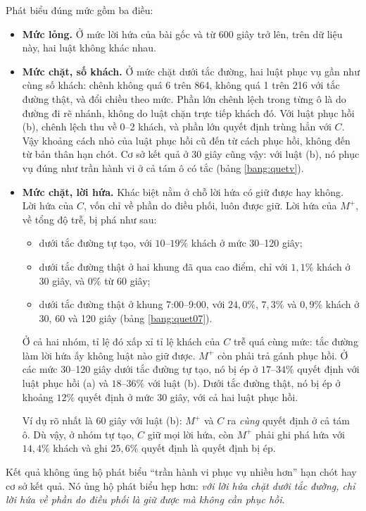 Phát biểu đúng mức gồm ba điều:
\begin{itemize}
\item \textbf{Mức lỏng.} Ở mức lời hứa của bài gốc và từ 600 giây trở lên, trên dữ liệu này, hai luật
không khác nhau.
\item \textbf{Mức chặt, số khách.} Ở mức chặt dưới tắc đường, hai luật phục vụ gần như cùng số khách:
chênh không quá 6 trên 864, không quá 1 trên 216 với tắc đường thật, và đổi chiều theo mức. Phần lớn chênh lệch trong từng ô là do đường đi rẽ
nhánh, không do luật chặn trực tiếp khách đó. Với luật phục hồi (b), chênh lệch thu về 0--2 khách, và
phần lớn quyết định trùng hẳn với $C$. Vậy khoảng cách nhỏ của luật phục hồi cũ đến từ cách phục hồi,
không đến từ bản thân hạn chót. Cơ sở kết quả ở 30 giây cũng vậy: với luật (b), nó phục vụ đúng như trần hành
vi ở cả tám ô có tắc (bảng \ref{bang:quetv}).
\item \textbf{Mức chặt, lời hứa.} Khác biệt nằm ở chỗ lời hứa có giữ được hay không. Lời hứa của $C$,
vốn chỉ về phần do điều phối, luôn được giữ. Lời hứa của $M^{+}$, về tổng độ trễ, bị phá như sau:
  \begin{itemize}
  \item dưới tắc đường tự tạo, với $10$--$19\%$ khách ở mức 30--120 giây;
  \item dưới tắc đường thật ở hai khung đã qua cao điểm, chỉ với $1{,}1\%$ khách ở 30 giây, và $0\%$ từ 60 giây;
  \item dưới tắc đường thật ở khung 7:00--9:00, với $24{,}0\%$, $7{,}3\%$ và $0{,}9\%$ khách ở 30, 60 và 120 giây
  (bảng \ref{bang:quet07}).
  \end{itemize}
Ở cả hai nhóm, tỉ lệ đó xấp xỉ tỉ lệ khách của $C$ trễ quá cùng mức: tắc đường làm lời hứa ấy không
luật nào giữ được. $M^{+}$ còn phải trả gánh phục hồi. Ở các mức 30--120 giây dưới tắc đường tự tạo, nó
bị ép ở $17$--$34\%$ quyết định với luật phục hồi (a) và $18$--$36\%$ với luật (b). Dưới tắc đường thật,
nó bị ép ở khoảng $12\%$ quyết định ở mức 30 giây, với cả hai luật phục hồi.

Ví dụ rõ nhất là 60 giây với luật (b): $M^{+}$ và $C$ ra \emph{cùng} quyết định ở cả tám ô. Dù vậy, ở
nhóm tự tạo, $C$ giữ mọi lời hứa, còn $M^{+}$ phải ghi phá hứa với $14{,}4\%$ khách và ghi $25{,}6\%$
quyết định là quyết định bị ép.
\end{itemize}

Kết quả không ủng hộ phát biểu ``trần hành vi phục vụ nhiều hơn'' hạn chót hay cơ sở kết quả. Nó ủng hộ phát biểu hẹp hơn:
\emph{với lời hứa chặt dưới tắc đường, chỉ lời hứa về phần do điều phối là giữ được mà không cần
phục hồi}.

